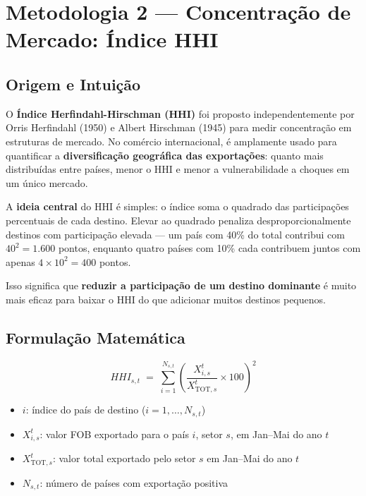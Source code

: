 \documentclass[12pt, a4paper]{article}
\begin{document}
\section{Metodologia 2 --- Concentração de Mercado: Índice HHI}
\label{sec:hhi}

\subsection{Origem e Intuição}

O \textbf{Índice Herfindahl-Hirschman (HHI)} foi proposto independentemente
por Orris Herfindahl (1950) e Albert Hirschman (1945) para medir concentração
em estruturas de mercado. No comércio internacional, é amplamente usado para
quantificar a \textbf{diversificação geográfica das exportações}:
quanto mais distribuídas entre países, menor o HHI e menor a vulnerabilidade
a choques em um único mercado.

\medskip
A \textbf{ideia central} do HHI é simples:
o índice soma o quadrado das participações percentuais de cada destino.
Elevar ao quadrado penaliza desproporcionalmente destinos com participação
elevada --- um país com 40\% do total contribui com $40^2 = 1.600$ pontos,
enquanto quatro países com 10\% cada contribuem juntos com apenas
$4 \times 10^2 = 400$ pontos.

Isso significa que \textbf{reduzir a participação de um destino dominante}
é muito mais eficaz para baixar o HHI do que adicionar muitos destinos pequenos.

\subsection{Formulação Matemática}

\begin{formulabox}
\begin{equation}
  HHI_{s,t}
    \;=\; \sum_{i=1}^{N_{s,t}}
          \left(\frac{X_{i,s}^{t}}{X_{\text{TOT},s}^{t}} \times 100\right)^{\!2}
  \label{eq:hhi}
\end{equation}

\begin{itemize}[noitemsep]
  \item $i$: índice do país de destino ($i = 1, \dots, N_{s,t}$)
  \item $X_{i,s}^{t}$: valor FOB exportado para o país $i$, setor $s$,
    em Jan--Mai do ano $t$
  \item $X_{\text{TOT},s}^{t}$: valor total exportado pelo setor $s$
    em Jan--Mai do ano $t$
  \item $N_{s,t}$: número de países com exportação positiva
\end{itemize}
\end{formulabox}
\end{document}
